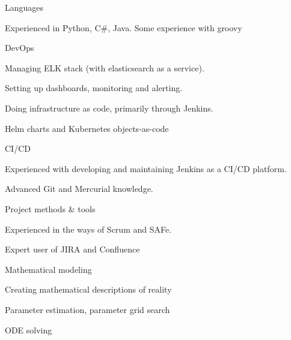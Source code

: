 


\begin{cvskills}

\cvskill
{Languages} %
{
\begin{cvitems}
  \vspace{2mm}
\item {Experienced in Python, C\#, Java. Some experience with groovy}
\end{cvitems}
}

\cvskill
{DevOps} %
{
\begin{cvitems}
  \vspace{2mm}
\item {Managing ELK stack (with elasticsearch as a service).}
\item {Setting up dashboards, monitoring and alerting.}
\item {Doing infrastructure as code, primarily through Jenkins.}
\item {Helm charts and Kubernetes objects-as-code}
\end{cvitems}
}

\cvskill
{CI/CD} %
{
\begin{cvitems}
  \vspace{2mm}
\item {Experienced with developing and maintaining Jenkins as a CI/CD platform.}
\item {Advanced Git and Mercurial knowledge.}
\end{cvitems}
}

\cvskill
{Project methods \& tools} %
{
\begin{cvitems}
  \vspace{2mm}
\item {Experienced in the ways of Scrum and SAFe.}
\item Expert user of JIRA and Confluence
\end{cvitems}
}
\cvskill
{Mathematical modeling} %
{
\begin{cvitems}
  \vspace{2mm}
\item {Creating mathematical descriptions of reality}
\item Parameter estimation, parameter grid search
\item ODE solving
\end{cvitems}
}


\end{cvskills}
